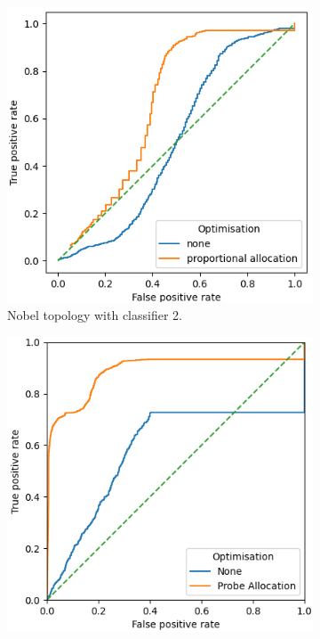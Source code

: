 \begin{figure}[H]
    \centering
    \begin{subfigure}[H]{0.475\textwidth}
        \includegraphics[width=\textwidth]{figs/results/nobel-germany_ac2_opt.png}
        \caption{Nobel topology with classifier 2.}
    \end{subfigure}
    \begin{subfigure}[H]{0.475\textwidth}
        \includegraphics[width=\textwidth]{figs/results/nobel-germany_ac3_opt.png}

\end{subfigure}
\end{figure}

